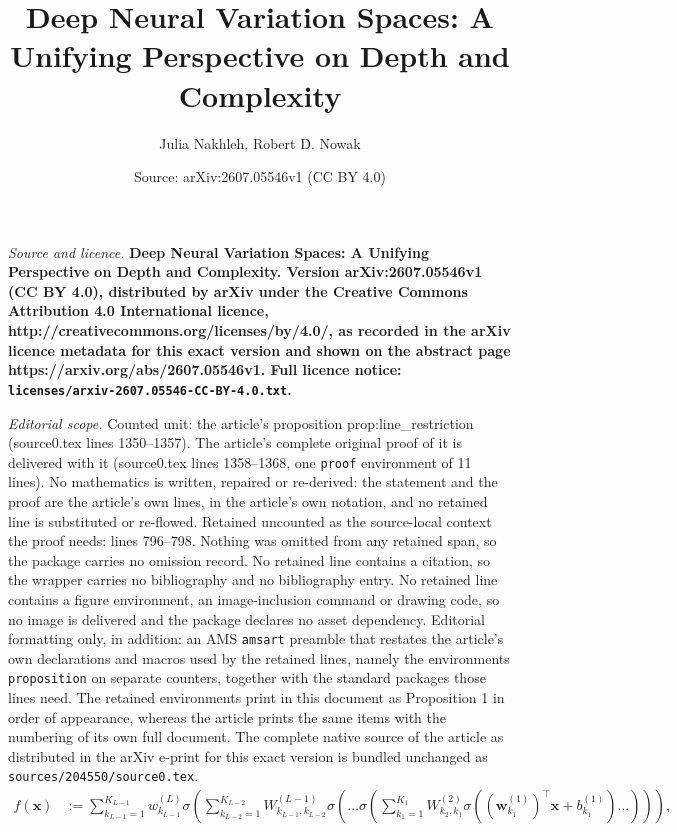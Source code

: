 \documentclass[10pt,a4paper]{amsart}
\title{\bf Deep Neural Variation Spaces: A Unifying Perspective on Depth and Complexity}
\author{Julia Nakhleh, Robert D. Nowak}
\date{Source: arXiv:2607.05546v1 (CC BY 4.0)}
\def\vw{{\bm{w}}}
\def\vx{{\bm{x}}}
\begin{document}
\maketitle

\noindent\emph{Source and licence.} \bf Deep Neural Variation Spaces: A Unifying Perspective on Depth and Complexity. Version arXiv:2607.05546v1 (CC BY 4.0), distributed by arXiv under the Creative Commons Attribution 4.0 International licence, http://creativecommons.org/licenses/by/4.0/, as recorded in the arXiv licence metadata for this exact version and shown on the abstract page https://arxiv.org/abs/2607.05546v1. Full licence notice: \texttt{licenses/arxiv-2607.05546-CC-BY-4.0.txt}.\par\smallskip

\noindent\textit{Editorial scope.} Counted unit: the article's proposition prop:line\_restriction (source0.tex lines 1350--1357). The article's complete original proof of it is delivered with it (source0.tex lines 1358--1368, one \texttt{proof} environment of 11 lines). No mathematics is written, repaired or re-derived: the statement and the proof are the article's own lines, in the article's own notation, and no retained line is substituted or re-flowed.  Retained uncounted as the source-local context the proof needs: lines 796--798.  Nothing was omitted from any retained span, so the package carries no omission record.  No retained line contains a citation, so the wrapper carries no bibliography and no bibliography entry.  No retained line contains a figure environment, an image-inclusion command or drawing code, so no image is delivered and the package declares no asset dependency.  Editorial formatting only, in addition: an AMS \texttt{amsart} preamble that restates the article's own declarations and macros used by the retained lines, namely the environments \texttt{proposition} on separate counters, together with the standard packages those lines need.  The retained environments print in this document as Proposition 1 in order of appearance, whereas the article prints the same items with the numbering of its own full document.  The complete native source of the article as distributed in the arXiv e-print for this exact version is bundled unchanged as \texttt{sources/204550/source0.tex}.
\begin{align} \label{eq:deep_nn_sum}
    f(\vx) &:= \sum_{k_{L-1}=1}^{K_{L-1}} w_{k_{L-1}}^{(L)} \sigma \left( \sum_{k_{L-2}=1}^{K_{L-2}} W_{k_{L-1},k_{L-2}}^{(L-1)} \sigma \left(  \dots \sigma \left( \sum_{k_1=1}^{K_1} W_{k_2, k_1}^{(2)} \sigma \left( ( \vw_{k_1}^{(1)} )^\top \vx + b_{k_1}^{(1)}  \right) \dots  \right)\right) \right),
\end{align}
\end{document}
